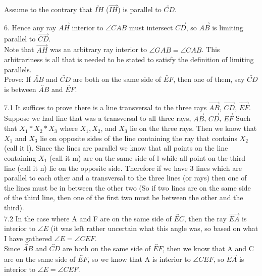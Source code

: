 \documentclass[12pt,letterpaper]{article}
\begin{document}
Assume to the contrary that $\overleftrightarrow{IH}$ ($ \overrightarrow{IH}$) is parallel to $\overleftrightarrow{CD}$. 




6. Hence any ray $\overrightarrow{AH}$ interior to $\angle CAB$ must intersect $\overrightarrow{CD}$, so $\overrightarrow{AB}$ is limiting parallel to $\overrightarrow{CD}$. \\

Note that $\overrightarrow{AH}$ was an arbitrary ray interior to $\angle GAB = \angle CAB$.  This arbitrariness is all that is needed to be stated to satisfy the definition of limiting parallels.\\

Prove: If $\overleftrightarrow{AB}$ and $\overleftrightarrow{CD}$ are both on the same side of $\overleftrightarrow{EF}$, then one of them, say $\overleftrightarrow{CD}$ is between $\overleftrightarrow{AB}$ and $\overleftrightarrow{EF}$.

7.1 It suffices to prove there is a line transversal to the three rays $\overrightarrow{AB}$, $\overrightarrow{CD}$, $\overrightarrow{EF}$.  \\

Suppose we had line that was a transversal to all three rays, $\overrightarrow{AB}$, $\overrightarrow{CD}$, $\overrightarrow{EF}$ Such that $X_1 *X_2 * X_3$ where $X_1, X_2$, and $X_3$ lie on the three rays.  Then we know that $X_1$ and $X_3$ lie on opposite sides of the line containing the ray that contains $X_2$ (call it l).  Since the lines are parallel we know that all points on the line containing $X_1$ (call it m) are on the same side of l while all point on the third line (call it n) lie on the opposite side.  Therefore if we have 3 lines which are parallel to each other and a transversal to the three lines (or rays) then one of the lines must be in between the other two (So if two lines are on the same side of the third line, then one of the first two must be between the other and the third).\\



7.2 In the case where A and F are on the same side of $\overleftrightarrow{EC}$, then the ray $\overrightarrow{EA}$ is interior to $\angle E$ (it was left rather uncertain what this angle was, so based on what I have gathered $\angle E = \angle CEF$.  \\

Since $\overleftrightarrow{AB}$ and $\overleftrightarrow{CD}$ are both on the same side of $\overleftrightarrow{EF}$, then we know that A and C are on the same side of $\overleftrightarrow{EF}$, so we know that A is interior to $\angle CEF$, so $\overrightarrow{EA}$ is interior to $\angle E = \angle CEF$.\\
\end{document}

